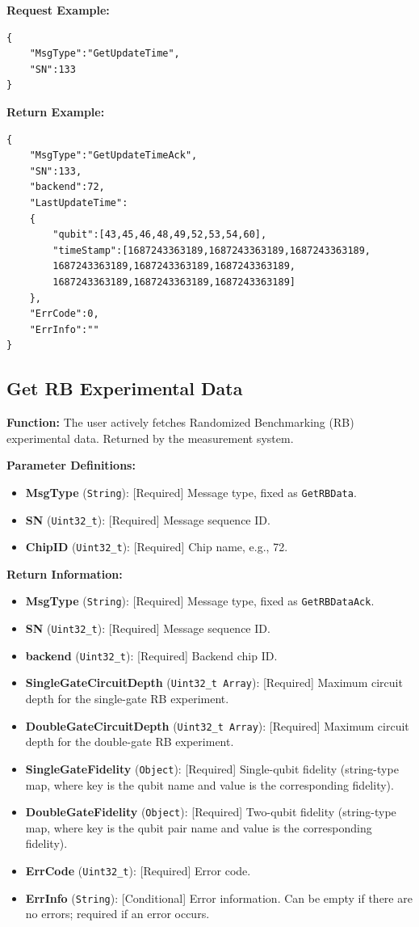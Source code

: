 \documentclass[12pt, a4paper]{article}
\begin{document}
\noindent \textbf{Request Example:}
\begin{lstlisting}
{
    "MsgType":"GetUpdateTime",
    "SN":133
}
\end{lstlisting}

\noindent \textbf{Return Example:}
\begin{lstlisting}
{
    "MsgType":"GetUpdateTimeAck",
    "SN":133,
    "backend":72,
    "LastUpdateTime":
    {
        "qubit":[43,45,46,48,49,52,53,54,60],
        "timeStamp":[1687243363189,1687243363189,1687243363189,
        1687243363189,1687243363189,1687243363189,
        1687243363189,1687243363189,1687243363189]
    },
    "ErrCode":0,
    "ErrInfo":""
}
\end{lstlisting}

\subsection{Get RB Experimental Data}

\textbf{Function:} The user actively fetches Randomized Benchmarking (RB) experimental data. Returned by the measurement system.

\textbf{Parameter Definitions:}
\begin{itemize}
    \item \textbf{MsgType} (\texttt{String}): [Required] Message type, fixed as \texttt{GetRBData}.
    \item \textbf{SN} (\texttt{Uint32\_t}): [Required] Message sequence ID.
    \item \textbf{ChipID} (\texttt{Uint32\_t}): [Required] Chip name, e.g., 72.
\end{itemize}

\textbf{Return Information:}
\begin{itemize}
    \item \textbf{MsgType} (\texttt{String}): [Required] Message type, fixed as \texttt{GetRBDataAck}.
    \item \textbf{SN} (\texttt{Uint32\_t}): [Required] Message sequence ID.
    \item \textbf{backend} (\texttt{Uint32\_t}): [Required] Backend chip ID.
    \item \textbf{SingleGateCircuitDepth} (\texttt{Uint32\_t Array}): [Required] Maximum circuit depth for the single-gate RB experiment.
    \item \textbf{DoubleGateCircuitDepth} (\texttt{Uint32\_t Array}): [Required] Maximum circuit depth for the double-gate RB experiment.
    \item \textbf{SingleGateFidelity} (\texttt{Object}): [Required] Single-qubit fidelity (string-type map, where key is the qubit name and value is the corresponding fidelity).
    \item \textbf{DoubleGateFidelity} (\texttt{Object}): [Required] Two-qubit fidelity (string-type map, where key is the qubit pair name and value is the corresponding fidelity).
    \item \textbf{ErrCode} (\texttt{Uint32\_t}): [Required] Error code.
    \item \textbf{ErrInfo} (\texttt{String}): [Conditional] Error information. Can be empty if there are no errors; required if an error occurs.
\end{itemize}
\end{document}
